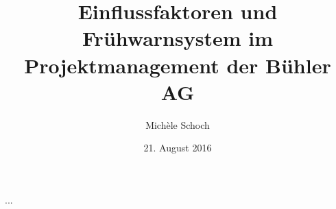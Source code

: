 \documentclass[11pt]{article}
\title{Einflussfaktoren und Frühwarnsystem im Projektmanagement der Bühler AG}
\author{Michèle Schoch}
\date{21. August 2016}
\begin{document}

\begin{titlepage}
\maketitle
\end{titlepage}

\tableofcontents
\newpage
\printnomenclature





\newpage

\newpage

\newpage

\newpage

\newpage

\newpage
\renewcommand\appendixtocname{Anhang}
\begin{appendices}
	...
\end{appendices}
\end{document}
